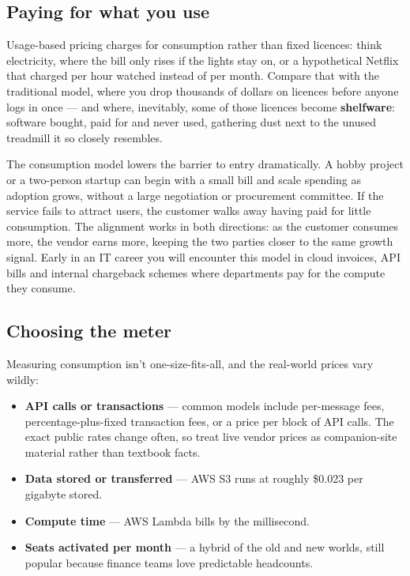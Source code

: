 \subsection{Paying for what you use}


Usage-based pricing charges for consumption rather than fixed licences: think electricity, where the bill only rises if the lights stay on, or a hypothetical Netflix that charged per hour watched instead of per month. Compare that with the traditional model, where you drop thousands of dollars on licences before anyone logs in once — and where, inevitably, some of those licences become \textbf{shelfware}: software bought, paid for and never used, gathering dust next to the unused treadmill it so closely resembles.


The consumption model lowers the barrier to entry dramatically. A hobby project or a two-person startup can begin with a small bill and scale spending as adoption grows, without a large negotiation or procurement committee. If the service fails to attract users, the customer walks away having paid for little consumption. The alignment works in both directions: as the customer consumes more, the vendor earns more, keeping the two parties closer to the same growth signal. Early in an IT career you will encounter this model in cloud invoices, API bills and internal chargeback schemes where departments pay for the compute they consume.



\subsection{Choosing the meter}


Measuring consumption isn't one-size-fits-all, and the real-world prices vary wildly:


\begin{itemize}[leftmargin=*]
\item \textbf{API calls or transactions} — common models include per-message fees, percentage-plus-fixed transaction fees, or a price per block of API calls. The exact public rates change often, so treat live vendor prices as companion-site material rather than textbook facts.
\item \textbf{Data stored or transferred} — AWS S3 runs at roughly \$0.023 per gigabyte stored.
\item \textbf{Compute time} — AWS Lambda bills by the millisecond.
\item \textbf{Seats activated per month} — a hybrid of the old and new worlds, still popular because finance teams love predictable headcounts.
\end{itemize}

